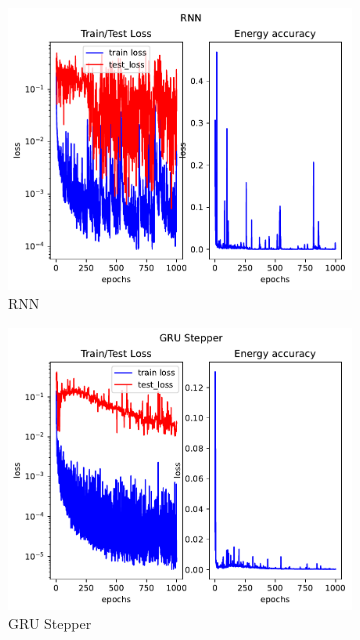 \begin{figure}[H]
	\begin{subfigure}[b]{0.3\textwidth}
		\centering
		\includegraphics[width=\textwidth]{chapters/chapter5/body2_rnn_loss.pdf}
		\caption{RNN}
	\end{subfigure}
	\hfill
	\begin{subfigure}[b]{0.3\textwidth}
		\centering
		\includegraphics[width=\textwidth]{chapters/chapter5/body2_gre_loss.pdf}
		\caption{GRU Stepper}
	\end{subfigure}
	\hfill
	\begin{subfigure}[b]{0.3\textwidth}
		\centering

\end{subfigure}
\end{figure}
